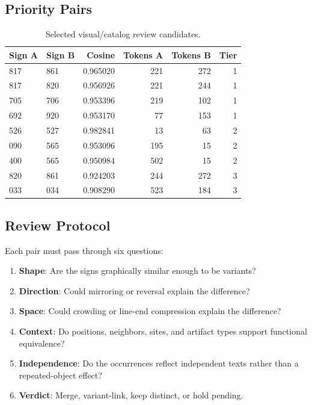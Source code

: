 \subsection{Priority Pairs}

\begin{table}[htbp]
\centering
\begin{tabular}{llrrrr}
\toprule
\textbf{Sign A} & \textbf{Sign B} & \textbf{Cosine} & \textbf{Tokens A} & \textbf{Tokens B} & \textbf{Tier} \\
\midrule
817 & 861 & 0.965020 & 221 & 272 & 1 \\
817 & 820 & 0.956926 & 221 & 244 & 1 \\
705 & 706 & 0.953396 & 219 & 102 & 1 \\
692 & 920 & 0.953170 & 77 & 153 & 1 \\
526 & 527 & 0.982841 & 13 & 63 & 2 \\
090 & 565 & 0.953096 & 195 & 15 & 2 \\
400 & 565 & 0.950984 & 502 & 15 & 2 \\
820 & 861 & 0.924203 & 244 & 272 & 3 \\
033 & 034 & 0.908290 & 523 & 184 & 3 \\
\bottomrule
\end{tabular}
\caption{Selected visual/catalog review candidates.}
\label{tab:visual-priority-pairs}
\end{table}

\subsection{Review Protocol}

Each pair must pass through six questions:

\begin{enumerate}
  \item \textbf{Shape}: Are the signs graphically similar enough to be variants?
  \item \textbf{Direction}: Could mirroring or reversal explain the difference?
  \item \textbf{Space}: Could crowding or line-end compression explain the difference?
  \item \textbf{Context}: Do positions, neighbors, sites, and artifact types support functional equivalence?
  \item \textbf{Independence}: Do the occurrences reflect independent texts rather than a repeated-object effect?
  \item \textbf{Verdict}: Merge, variant-link, keep distinct, or hold pending.
\end{enumerate}

